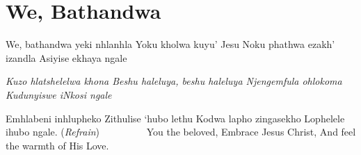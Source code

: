 \starttocol
\chapter{We, Bathandwa}
\nexttocol
\hfill{\it }
\stoptocol
\starttocol
\startlines
W{\sc e}, bathandwa yeki  nhlanhla
Yoku kholwa kuyu' Jesu
Noku phathwa ezakh' izandla
Asiyise ekhaya ngale

{\it
Kuzo hlatshelelwa khona
Beshu haleluya, beshu haleluya
Njengemfula ohlokoma
Kudunyiswe iNkosi ngale}

Emhlabeni inhlupheko
Zithulise `hubo lethu
Kodwa lapho zingasekho
Lophelele ihubo ngale.
 \hfill({\it Refrain})~~~~~~~~~
\stoplines
\nexttocol
You the beloved,
Embrace Jesus Christ,
And feel the warmth
of His Love.
\stoptocol
